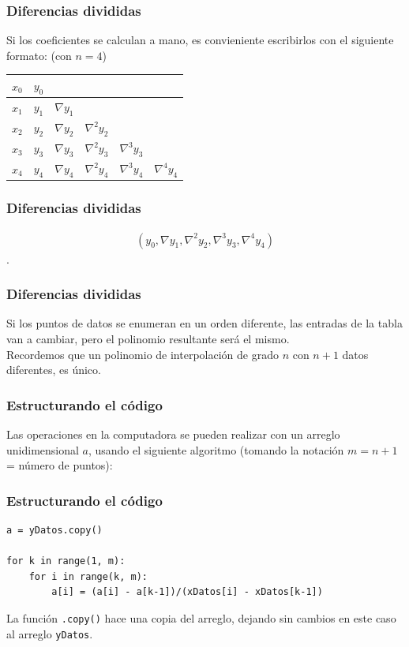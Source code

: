 \documentclass[12pt]{beamer}
\begin{document}
\begin{frame}
\frametitle{Diferencias divididas}
Si los coeficientes se calculan a mano, es convieniente escribirlos con el siguiente formato:
(con $n=4$)
\pause
\begin{table}
\centering
\small
\begin{tabular}{| c | c | c | c | c | c |}
\hline $x_{0}$ & $y_{0}$ & & & & \\
\hline $x_{1}$ & $y_{1}$ & $\nabla y_{1}$ & & & \\
\hline $x_{2}$ & $y_{2}$ & $\nabla y_{2}$ & $\nabla^{2} y_{2}$ & &  \\
\hline $x_{3}$ & $y_{3}$ & $\nabla y_{3}$ & $\nabla^{2} y_{3}$ & $\nabla^{3} y_{3}$ &  \\
\hline $x_{4}$ & $y_{4}$ & $\nabla y_{4}$ & $\nabla^{2} y_{4}$ & $\nabla^{3} y_{4}$ & $\nabla^{4} y_{4}$ \\
\hline
\end{tabular}
\end{table}
\end{frame}
\begin{frame}
\frametitle{Diferencias divididas}
\begin{align*}
(y_{0}, \nabla y_{1}, \nabla^{2} y_{2}, \nabla^{3} y_{3}, \nabla^{4} y_{4})
\end{align*}
\pause
{}.
\end{frame}
\begin{frame}
\frametitle{Diferencias divididas}
Si los puntos de datos se enumeran en un orden diferente, las entradas de la tabla van a cambiar, pero el polinomio resultante será el mismo.
\\
\bigskip
Recordemos que un polinomio de interpolación de grado $n$ con $n + 1$ datos diferentes, es único.
\end{frame}
\begin{frame}[fragile]
\frametitle{Estructurando el código}
Las operaciones en la computadora se pueden realizar con un arreglo unidimensional $a$, usando el siguiente algoritmo (tomando la notación $m = n + 1$ = número de puntos):
\end{frame}
\begin{frame}[fragile]
\frametitle{Estructurando el código}
\begin{lstlisting}[caption=Calculando los coeficientes del polinomio]
a = yDatos.copy()

for k in range(1, m):
    for i in range(k, m):
        a[i] = (a[i] - a[k-1])/(xDatos[i] - xDatos[k-1])
\end{lstlisting}
La función \texttt{.copy()} hace una copia del arreglo, dejando sin cambios en este caso al arreglo \texttt{yDatos}.
\end{frame}
\end{document}
